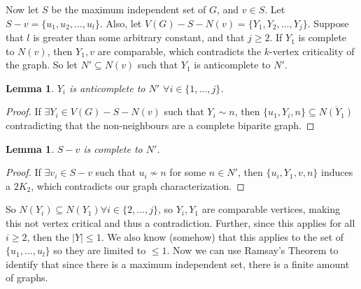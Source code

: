 \documentclass[11pt]{article}
\newtheorem{lemma}[theorem]{Lemma}
\theoremstyle{definition}
\begin{document}
Now let $S$ be the maximum independent set of $G$, and $v \in S$. Let $S - v = \{u_1, u_2, \dots, u_l \}$. Also, let $V(G) - S - N(v) = \{Y_1, Y_2, \dots, Y_j\}$. Suppose that $l$ is greater than some arbitrary constant, and that $j \geq 2$. If $Y_1$ is complete to $N(v)$, then $Y_1, v$ are comparable, which contradicts the $k$-vertex criticality of the graph. So let $N' \subseteq N(v)$ such that $Y_1$ is anticomplete to $N'$.

\begin{lemma}\label{lem:anticomplete}
$Y_i$ is anticomplete to $N'$ $\forall i \in \{1, \dots, j\}$.
\end{lemma}
\begin{proof}
If $\exists Y_i \in V(G) - S - N(v)$ such that $Y_i \sim n$, then $\{ u_1, Y_i, n \} \subseteq \overline{N(Y_1)}$ contradicting that the non-neighbours are a complete biparite graph. 
\end{proof}

\begin{lemma}\label{lem:ScompleteNprime}
$S- v$ is complete to $N'$.
\end{lemma}
\begin{proof}
If $\exists v_i \in S - v$ such that $u_i \not \sim n$ for some $n \in N'$, then $\{ u_i, Y_1, v, n \}$ induces a $2K_2$, which contradicts our graph characterization.
\end{proof}

So $N(Y_i) \subseteq N(Y_1) \forall i \in \{2, \dots, j\}$, so $Y_i, Y_1$ are comparable vertices, making this not vertex critical and thus a contradiction. Further, since this applies for all $i \geq 2$, then the $|Y| \leq 1$. We also know (somehow) that this applies to the set of $\{u_1, \dots, u_l \}$ so they are limited to $\leq 1$.
Now we can use Ramsay's Theorem to identify that since there is a maximum independent set, there is a finite amount of graphs.
\end{document}
